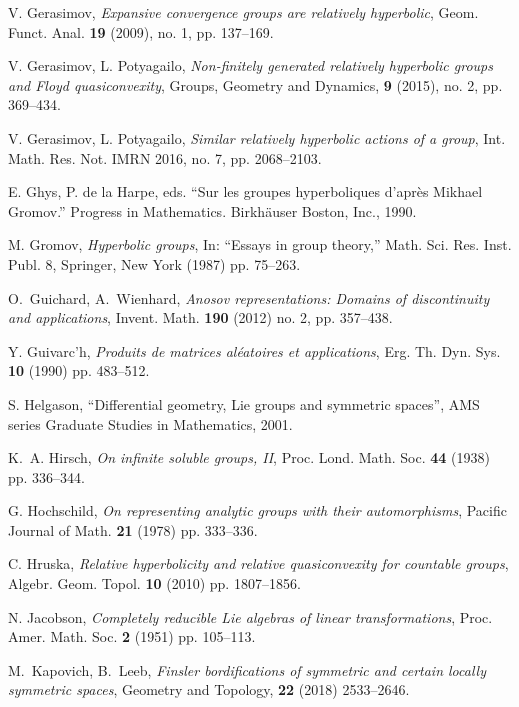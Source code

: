 \documentclass[12pt]{article}
\theoremstyle{boldplain}
\theoremstyle{bolddefinition}
\numberwithin{equation}{section}
\begin{document}
\begin{thebibliography}{BLP05}
V. Gerasimov, 
{\em Expansive convergence groups are relatively hyperbolic}, 
Geom. Funct. Anal. {\bf 19} (2009), no. 1, pp. 137--169.        
       
       
V. Gerasimov, L. Potyagailo, 
{\em Non-finitely generated relatively hyperbolic groups and Floyd quasiconvexity}, 
Groups, Geometry and Dynamics, {\bf 9} (2015), no. 2, pp. 369--434.    
             
V. Gerasimov, L. Potyagailo, 
{\em  Similar relatively hyperbolic actions of a group}, 
Int. Math. Res. Not. IMRN 2016, no. 7, pp. 2068--2103. 

E. Ghys, P. de la Harpe, eds. ``Sur les groupes hyperboliques d'apr{\`e}s Mikhael Gromov.'' 
Progress in Mathematics. Birkh{\"a}user Boston, Inc., 1990.
              
M. Gromov, {\em Hyperbolic groups}, In: ``Essays in group theory,'' Math. Sci. Res. Inst.
Publ. 8, Springer, New York (1987) pp. 75--263. 


O.\ Guichard, A.\ Wienhard, 
{\em Anosov representations: Domains of discontinuity and applications}, 
Invent. Math. {\bf 190} (2012) no. 2, pp. 357--438. 

Y. Guivarc'h, {\em Produits de matrices al\'eatoires et applications}, Erg. Th. Dyn. Sys. {\bf 10} (1990) pp. 483--512.

S. Helgason, ``Differential geometry, Lie groups and symmetric spaces'',  AMS series Graduate Studies in Mathematics, 2001. 


K.~A. Hirsch, \emph{On infinite soluble groups, {I}{I}}, Proc. Lond. Math. Soc.
  {\bf 44} (1938) pp. 336--344.



G. Hochschild, {\em On representing analytic groups with their automorphisms}, Pacific Journal of Math. {\bf 21} 
(1978)  pp. 333--336. 


C. Hruska, {\em Relative hyperbolicity and relative quasiconvexity for countable groups}, Algebr. Geom.
Topol. {\bf 10} (2010) pp. 1807--1856.

N. Jacobson, 
{\em Completely reducible Lie algebras of linear transformations},
Proc. Amer. Math. Soc. {\bf 2} (1951) pp. 105--113.

M.\ Kapovich, B.\ Leeb, {\em Finsler bordifications of symmetric and certain locally symmetric spaces}, Geometry and Topology, {\bf 22} (2018) 2533--2646. 




\end{thebibliography}
\end{document}
